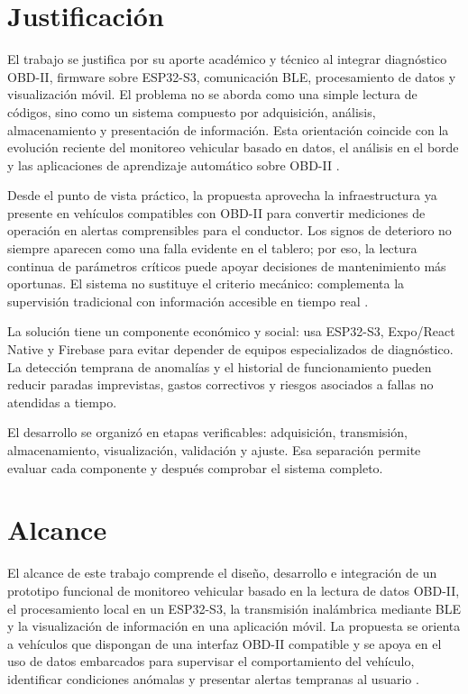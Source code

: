 \documentclass[12pt,letterpaper]{report}
\begin{document}
\section{Justificación}

El trabajo se justifica por su aporte académico y técnico al integrar diagnóstico OBD-II, firmware sobre ESP32-S3, comunicación BLE, procesamiento de datos y visualización móvil. El problema no se aborda como una simple lectura de códigos, sino como un sistema compuesto por adquisición, análisis, almacenamiento y presentación de información. Esta orientación coincide con la evolución reciente del monitoreo vehicular basado en datos, el análisis en el borde y las aplicaciones de aprendizaje automático sobre OBD-II \cite{michailidis2025_obdii_review,zhang2020_iov_edge,kalalas2025_ai_driven_monitoring}.

Desde el punto de vista práctico, la propuesta aprovecha la infraestructura ya presente en vehículos compatibles con OBD-II para convertir mediciones de operación en alertas comprensibles para el conductor. Los signos de deterioro no siempre aparecen como una falla evidente en el tablero; por eso, la lectura continua de parámetros críticos puede apoyar decisiones de mantenimiento más oportunas. El sistema no sustituye el criterio mecánico: complementa la supervisión tradicional con información accesible en tiempo real \cite{sae2022_j1978_obdii_scan_tool,mahale2025_review_predictive_maintenance,tormos2025_explainable_ai}.

La solución tiene un componente económico y social: usa ESP32-S3, Expo/React Native y Firebase para evitar depender de equipos especializados de diagnóstico. La detección temprana de anomalías y el historial de funcionamiento pueden reducir paradas imprevistas, gastos correctivos y riesgos asociados a fallas no atendidas a tiempo.

El desarrollo se organizó en etapas verificables: adquisición, transmisión, almacenamiento, visualización, validación y ajuste. Esa separación permite evaluar cada componente y después comprobar el sistema completo.

\section{Alcance}

El alcance de este trabajo comprende el diseño, desarrollo e integración de un prototipo funcional de monitoreo vehicular basado en la lectura de datos OBD-II, el procesamiento local en un ESP32-S3, la transmisión inalámbrica mediante BLE y la visualización de información en una aplicación móvil. La propuesta se orienta a vehículos que dispongan de una interfaz OBD-II compatible y se apoya en el uso de datos embarcados para supervisar el comportamiento del vehículo, identificar condiciones anómalas y presentar alertas tempranas al usuario \cite{sae2022_j1978_obdii_scan_tool,michailidis2025_obdii_review}.
\end{document}
